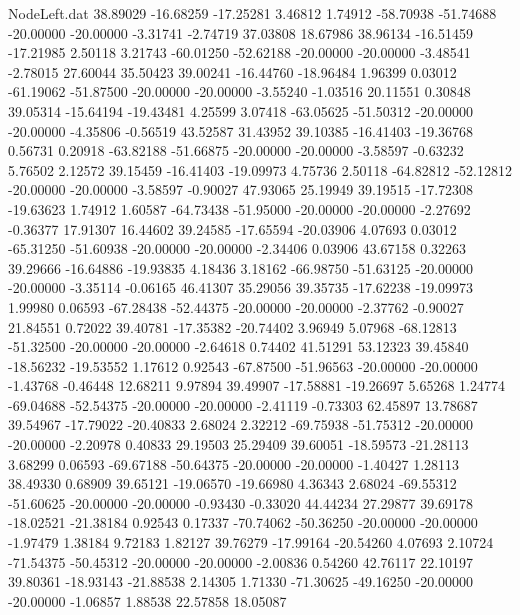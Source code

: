 \begin{filecontents}{NodeLeft.dat}
  38.89029  -16.68259  -17.25281     3.46812    1.74912  -58.70938  -51.74688  -20.00000  -20.00000   -3.31741   -2.74719   37.03808   18.67986
  38.96134  -16.51459  -17.21985     2.50118    3.21743  -60.01250  -52.62188  -20.00000  -20.00000   -3.48541   -2.78015   27.60044   35.50423
  39.00241  -16.44760  -18.96484     1.96399    0.03012  -61.19062  -51.87500  -20.00000  -20.00000   -3.55240   -1.03516   20.11551    0.30848
  39.05314  -15.64194  -19.43481     4.25599    3.07418  -63.05625  -51.50312  -20.00000  -20.00000   -4.35806   -0.56519   43.52587   31.43952
  39.10385  -16.41403  -19.36768     0.56731    0.20918  -63.82188  -51.66875  -20.00000  -20.00000   -3.58597   -0.63232    5.76502    2.12572
  39.15459  -16.41403  -19.09973     4.75736    2.50118  -64.82812  -52.12812  -20.00000  -20.00000   -3.58597   -0.90027   47.93065   25.19949
  39.19515  -17.72308  -19.63623     1.74912    1.60587  -64.73438  -51.95000  -20.00000  -20.00000   -2.27692   -0.36377   17.91307   16.44602
  39.24585  -17.65594  -20.03906     4.07693    0.03012  -65.31250  -51.60938  -20.00000  -20.00000   -2.34406    0.03906   43.67158    0.32263
  39.29666  -16.64886  -19.93835     4.18436    3.18162  -66.98750  -51.63125  -20.00000  -20.00000   -3.35114   -0.06165   46.41307   35.29056
  39.35735  -17.62238  -19.09973     1.99980    0.06593  -67.28438  -52.44375  -20.00000  -20.00000   -2.37762   -0.90027   21.84551    0.72022
  39.40781  -17.35382  -20.74402     3.96949    5.07968  -68.12813  -51.32500  -20.00000  -20.00000   -2.64618    0.74402   41.51291   53.12323
  39.45840  -18.56232  -19.53552     1.17612    0.92543  -67.87500  -51.96563  -20.00000  -20.00000   -1.43768   -0.46448   12.68211    9.97894
  39.49907  -17.58881  -19.26697     5.65268    1.24774  -69.04688  -52.54375  -20.00000  -20.00000   -2.41119   -0.73303   62.45897   13.78687
  39.54967  -17.79022  -20.40833     2.68024    2.32212  -69.75938  -51.75312  -20.00000  -20.00000   -2.20978    0.40833   29.19503   25.29409
  39.60051  -18.59573  -21.28113     3.68299    0.06593  -69.67188  -50.64375  -20.00000  -20.00000   -1.40427    1.28113   38.49330    0.68909
  39.65121  -19.06570  -19.66980     4.36343    2.68024  -69.55312  -51.60625  -20.00000  -20.00000   -0.93430   -0.33020   44.44234   27.29877
  39.69178  -18.02521  -21.38184     0.92543    0.17337  -70.74062  -50.36250  -20.00000  -20.00000   -1.97479    1.38184    9.72183    1.82127
  39.76279  -17.99164  -20.54260     4.07693    2.10724  -71.54375  -50.45312  -20.00000  -20.00000   -2.00836    0.54260   42.76117   22.10197
  39.80361  -18.93143  -21.88538     2.14305    1.71330  -71.30625  -49.16250  -20.00000  -20.00000   -1.06857    1.88538   22.57858   18.05087

\end{filecontents}
